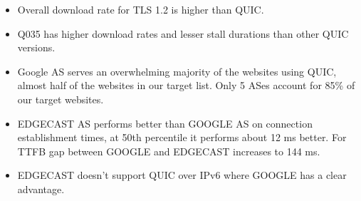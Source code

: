 \begin{frame}
\begin{itemize}
\item Overall download rate for TLS 1.2 is higher than QUIC.


\item Q035 has higher download rates and lesser stall durations than other QUIC versions.

\item Google AS serves an overwhelming majority of the websites using QUIC, almost half of the websites in our target list. Only 5 ASes account for 85\% of our target websites.

\item EDGECAST AS performs better than GOOGLE AS on connection establishment times, at 50th percentile it performs about 12 ms better. For TTFB gap between GOOGLE and EDGECAST increases to 144 ms. 

\item EDGECAST doesn't support QUIC over IPv6 where GOOGLE has a clear advantage. 


\end{itemize}
\end{frame}
\clearpage

